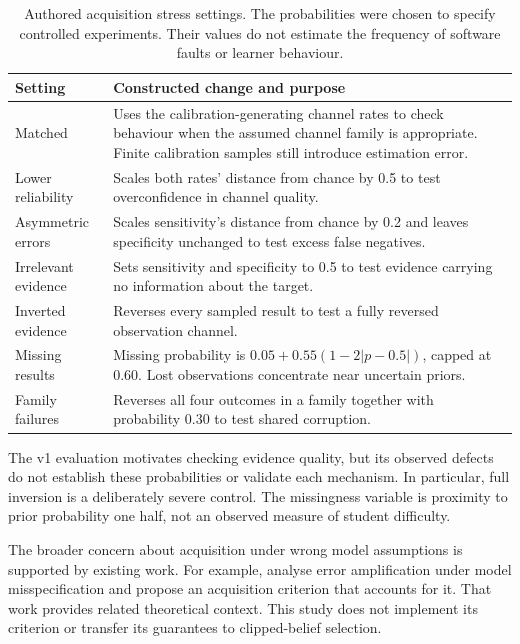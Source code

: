 \begin{table}[htbp]
 \centering
 \begin{tabularx}{\textwidth}{@{}>{\raggedright\arraybackslash}p{}>{\raggedright\arraybackslash}X@{}}
 \toprule
 Setting & Constructed change and purpose \\
 \midrule
 Matched & Uses the calibration-generating channel rates to check behaviour when the assumed channel family is appropriate. Finite calibration samples still introduce estimation error. \\
 Lower reliability & Scales both rates' distance from chance by 0.5 to test overconfidence in channel quality. \\
 Asymmetric errors & Scales sensitivity's distance from chance by 0.2 and leaves specificity unchanged to test excess false negatives. \\
 Irrelevant evidence & Sets sensitivity and specificity to 0.5 to test evidence carrying no information about the target. \\
 Inverted evidence & Reverses every sampled result to test a fully reversed observation channel. \\
 Missing results & Missing probability is $0.05+0.55(1-2|p-0.5|)$, capped at 0.60. Lost observations concentrate near uncertain priors. \\
 Family failures & Reverses all four outcomes in a family together with probability 0.30 to test shared corruption. \\
 \bottomrule
 \end{tabularx}
 \caption{Authored acquisition stress settings. The probabilities were chosen to specify controlled experiments. Their values
 do not estimate the frequency of software faults or learner behaviour.}
 \label{tab:acquisition-faults}
\end{table}

The v1 evaluation motivates checking evidence quality, but its observed defects do not establish these probabilities or validate
each mechanism. In particular, full inversion is a deliberately severe control. The missingness variable is proximity to prior
probability one half, not an observed measure of student difficulty.

The broader concern about acquisition under wrong model assumptions is supported by existing work. For example,
\textcite{tang2026robust} analyse error amplification under model misspecification and propose an acquisition criterion that
accounts for it. That work provides related theoretical context. This study does not implement its criterion or transfer its
guarantees to clipped-belief selection.

